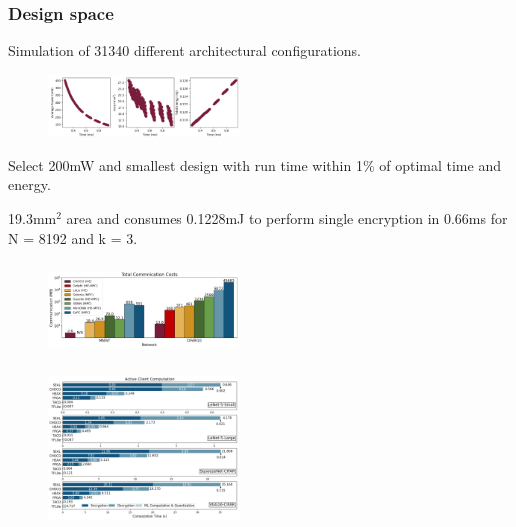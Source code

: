 \documentclass[10pt,handout]{beamer}
\begin{document}
\begin{frame}
\frametitle{Design space}

Simulation of 31340 different architectural configurations.
\begin{figure}
    \includegraphics[width=0.45\textwidth]{design-space.png}
\end{figure}
Select 200mW and smallest design with run time within 1\% of optimal time and energy.

19.3mm$^2$ area and consumes 0.1228mJ to perform single encryption in 0.66ms for N = 8192 and k = 3.
\end{frame}





\begin{frame}
\frametitle{}
\begin{figure}
    \includegraphics[width=0.45\textwidth]{comunication.png}
\end{figure}

\end{frame}



\begin{frame}
    \frametitle{}
    \begin{figure}
    \includegraphics[width=0.45\textwidth]{motivation2.png}
\end{figure}


\end{frame}
\end{document}
